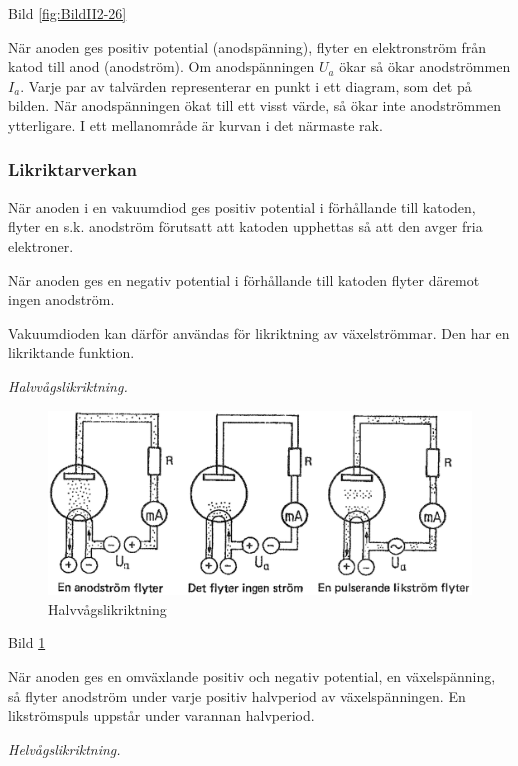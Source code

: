 Bild \ref{fig:BildII2-26}

När anoden ges positiv potential (anodspänning), flyter en elektronström från
katod till anod (anodström). Om anodspänningen \(U_a\) ökar så ökar anodströmmen
\(I_a\). Varje par av talvärden representerar en punkt i ett diagram, som det på
bilden. När anodspänningen ökat till ett visst värde, så ökar inte anodströmmen
ytterligare. I ett mellanområde är kurvan
i det närmaste rak.

\subsubsection{Likriktarverkan}

När anoden i en vakuumdiod ges positiv potential i förhållande till katoden,
flyter en s.k. anodström förutsatt att katoden upphettas så att den avger fria
elektroner.

När anoden ges en negativ potential i förhållande till katoden flyter däremot
ingen anodström.

Vakuumdioden kan därför användas för likriktning av växelströmmar. Den har en
likriktande funktion.

\emph{Halvvågslikriktning.}

\begin{figure}
\includegraphics[width=\textwidth]{images/cropped_pdfs/bild_2_2-27.pdf}
\caption{Halvvågslikriktning}
\label{fig:BildII2-27}
\end{figure}

Bild \ref{fig:BildII2-27}

När anoden ges en omväxlande positiv och negativ potential, en växelspänning, så
flyter anodström under varje positiv halvperiod av växelspänningen. En
likströmspuls uppstår under varannan halvperiod.

\emph{Helvågslikriktning.}

